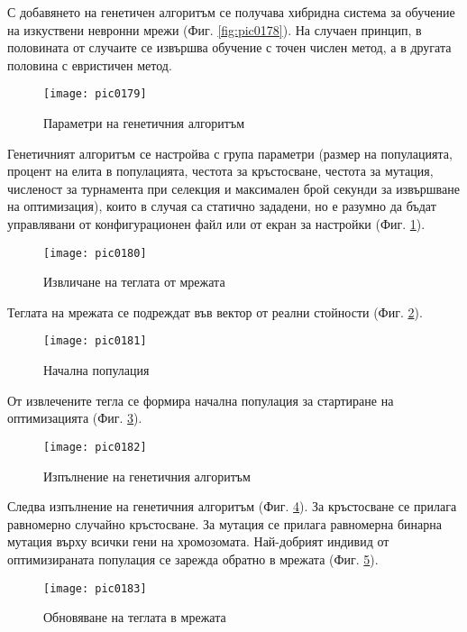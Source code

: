 С добавянето на генетичен алгоритъм се получава хибридна система за обучение на изкуствени невронни мрежи (Фиг. \ref{fig:pic0178}). На случаен принцип, в половината от случаите се извършва обучение с точен числен метод, а в другата половина с евристичен метод. 

\begin{figure}[h]
  \centering
  \texttt{[image: pic0179]}
  \caption{Параметри на генетичния алгоритъм}
\label{fig:pic0179}
\end{figure}
\FloatBarrier

Генетичният алгоритъм се настройва с група параметри (размер на популацията, процент на елита в популацията, честота за кръстосване, честота за мутация, численост за турнамента при селекция и максимален брой секунди за извършване на оптимизация), които в случая са статично зададени, но е разумно да бъдат управлявани от конфигурационен файл или от екран за настройки (Фиг. \ref{fig:pic0179}). 

\begin{figure}[h]
  \centering
  \texttt{[image: pic0180]}
  \caption{Извличане на теглата от мрежата}
\label{fig:pic0180}
\end{figure}
\FloatBarrier

Теглата на мрежата се подреждат във вектор от реални стойности (Фиг. \ref{fig:pic0180}).

\begin{figure}[h]
  \centering
  \texttt{[image: pic0181]}
  \caption{Начална популация}
\label{fig:pic0181}
\end{figure}
\FloatBarrier

От извлечените тегла се формира начална популация за стартиране на оптимизацията (Фиг. \ref{fig:pic0181}).

\begin{figure}[h]
  \centering
  \texttt{[image: pic0182]}
  \caption{Изпълнение на генетичния алгоритъм}
\label{fig:pic0182}
\end{figure}
\FloatBarrier

Следва изпълнение на генетичния алгоритъм (Фиг. \ref{fig:pic0182}). За кръстосване се прилага равномерно случайно кръстосване. За мутация се прилага равномерна бинарна мутация върху всички гени на хромозомата. Най-добрият индивид от оптимизираната популация се зарежда обратно в мрежата (Фиг. \ref{fig:pic0183}). 

\begin{figure}[h]
  \centering
  \texttt{[image: pic0183]}
  \caption{Обновяване на теглата в мрежата}
\label{fig:pic0183}
\end{figure}
\FloatBarrier

